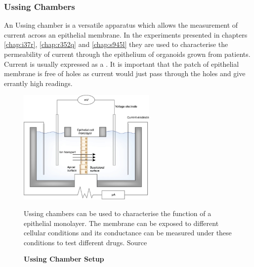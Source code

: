 \subsubsection{Ussing Chambers}
An Ussing chamber is a versatile apparatus which allows the measurement of current across an epithelial membrane. In the experiments presented in chapters \ref{chap:i37r}, \ref{chap:r352q} and \ref{chap:s945l} they are used to characterise the permeability of current through the epithelium of organoids grown from patients. Current is usually expressed as a . It is important that the patch of epithelial membrane is free of holes as current would just pass through the holes and give errantly high readings.

\begin{figure}
	\label{ussing_chamber}
	\begin{center}
	\includegraphics[width=0.6\textwidth]{figures/ussing_chamber.jpg}
	\end{center}
	\captionsetup{singlelinecheck = false, justification=raggedright}
	\caption[Ussing Chamber Setup] {\textbf{Ussing Chamber Setup}}{Ussing chambers can be used to characterise the function of a epithelial monolayer. The membrane can be exposed to different cellular conditions and its conductance can be measured under these conditions to test different drugs. Source \cite{hoenig2014}} 
\end{figure}

